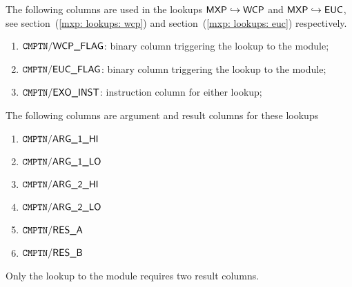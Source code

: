 The following columns are used in the lookups
$\textsf{MXP} \hookrightarrow \textsf{WCP}$ and
$\textsf{MXP} \hookrightarrow \textsf{EUC}$, see
section~(\ref{mxp: lookups: wcp}) and
section~(\ref{mxp: lookups: euc}) respectively.
\begin{enumerate}
	\item
		$\texttt{CMPTN}\textsf{/}{\textsf{WCP\_FLAG}}$:
		binary column triggering the lookup to the \wcpMod{} module;
	\item
		$\texttt{CMPTN}\textsf{/}{\textsf{EUC\_FLAG}}$:
		binary column triggering the lookup to the \eucMod{} module;
	\item
		$\texttt{CMPTN}\textsf{/}{\textsf{EXO\_INST}}$:
		instruction column for either lookup;
\end{enumerate}
The following columns are argument and result columns for these lookups
\begin{multicols}{3}
	\begin{enumerate}[resume]
		\item
			$\texttt{CMPTN}\textsf{/}{\textsf{ARG\_1\_HI}}$
		\item
			$\texttt{CMPTN}\textsf{/}{\textsf{ARG\_1\_LO}}$
		\item
			$\texttt{CMPTN}\textsf{/}{\textsf{ARG\_2\_HI}}$
		\item
			$\texttt{CMPTN}\textsf{/}{\textsf{ARG\_2\_LO}}$
		\item
			$\texttt{CMPTN}\textsf{/}{\textsf{RES\_A}}$
		\item
			$\texttt{CMPTN}\textsf{/}{\textsf{RES\_B}}$
	\end{enumerate}
\end{multicols}
\saNote{}
Only the lookup to the \eucMod{} module requires two result columns.
